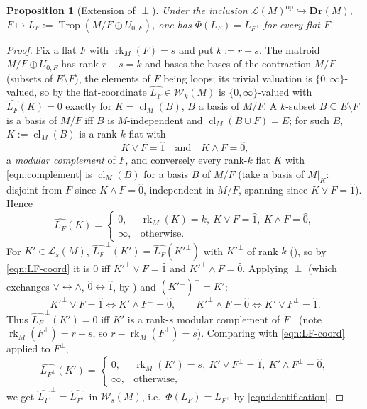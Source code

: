 \documentclass{article}
\newtheorem{proposition}[theorem]{Proposition}
\theoremstyle{definition}
\newcommand{\rk}{\operatorname{rk}}
\newcommand{\cl}{\operatorname{cl}}
\newcommand{\Trop}{\operatorname{Trop}}
\newcommand{\op}{\operatorname{op}}
\newcommand{\into}{\hookrightarrow}
\newcommand{\Dr}{\mathbf{Dr}}
\newcommand{\cLL}{\mathcal{L}}
\newcommand{\cW}{\mathcal{W}}
\begin{document}
\begin{proposition}[Extension of $\perp$]\label{prop:ext}
Under the inclusion $\cLL(M)^{\op}\into\Dr(M)$, $F\mapsto L_F:=\Trop(M/F\oplus U_{0,F})$, one has
$\Phi(L_F)=L_{F^{\perp}}$ for every flat $F$.
\end{proposition}

\begin{proof}
Fix a flat $F$ with $\rk_M(F)=s$ and put $k:=r-s$. The matroid $M/F\oplus U_{0,F}$ has rank $r-s=k$
and bases the bases of the contraction $M/F$ (subsets of $E\setminus F$), the elements of $F$ being
loops; its trivial valuation is $\{0,\infty\}$-valued, so by  the
flat-coordinate $\widehat{L_F}\in\cW_k(M)$ is $\{0,\infty\}$-valued with $\widehat{L_F}(K)=0$ exactly
for $K=\cl_M(B)$, $B$ a basis of $M/F$. A $k$-subset $B\subseteq E\setminus F$ is a basis of $M/F$ iff
$B$ is $M$-independent and $\cl_M(B\cup F)=E$; for such $B$, $K:=\cl_M(B)$ is a rank-$k$ flat with
\begin{equation}\label{eqn:complement}
  K\vee F=\hat1\quad\text{and}\quad K\wedge F=\hat0,
\end{equation}
a \emph{modular complement} of $F$, and conversely every rank-$k$ flat $K$ with \eqref{eqn:complement}
is $\cl_M(B)$ for a basis $B$ of $M/F$ (take a basis of $M|_K$: disjoint from $F$ since $K\wedge
F=\hat0$, independent in $M/F$, spanning since $K\vee F=\hat1$). Hence
\begin{equation}\label{eqn:LF-coord}
  \widehat{L_F}(K)=\begin{cases}0,& \rk_M(K)=k,\ K\vee F=\hat1,\ K\wedge F=\hat0,\\
  \infty,&\text{otherwise.}\end{cases}
\end{equation}
For $K'\in\cLL_{s}(M)$, $\widehat{L_F}^{\,\perp}(K')=\widehat{L_F}(K'^{\perp})$ with $K'^{\perp}$ of
rank $k$ (), so by \eqref{eqn:LF-coord} it is $0$ iff $K'^{\perp}\vee F=\hat1$ and
$K'^{\perp}\wedge F=\hat0$. Applying $\perp$ (which exchanges $\vee\leftrightarrow\wedge$,
$\hat0\leftrightarrow\hat1$, by ) and $(K'^{\perp})^{\perp}=K'$:
\[
  K'^{\perp}\vee F=\hat1\Longleftrightarrow K'\wedge F^{\perp}=\hat0,\qquad
  K'^{\perp}\wedge F=\hat0\Longleftrightarrow K'\vee F^{\perp}=\hat1.
\]
Thus $\widehat{L_F}^{\,\perp}(K')=0$ iff $K'$ is a rank-$s$ modular complement of $F^{\perp}$ (note
$\rk_M(F^{\perp})=r-s$, so $r-\rk_M(F^{\perp})=s$). Comparing with \eqref{eqn:LF-coord} applied to
$F^{\perp}$,
\[
  \widehat{L_{F^{\perp}}}(K')=\begin{cases}0,&\rk_M(K')=s,\ K'\vee F^{\perp}=\hat1,\ K'\wedge
  F^{\perp}=\hat0,\\ \infty,&\text{otherwise,}\end{cases}
\]
we get $\widehat{L_F}^{\,\perp}=\widehat{L_{F^{\perp}}}$ in $\cW_s(M)$, i.e.\ $\Phi(L_F)=L_{F^{\perp}}$
by \eqref{eqn:identification}.
\end{proof}
\end{document}
